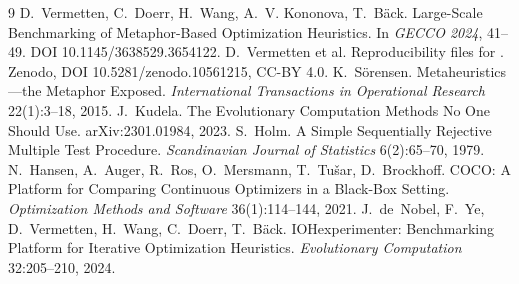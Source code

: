 \documentclass[11pt]{article}
\begin{document}
\begin{thebibliography}{9}
 D.~Vermetten, C.~Doerr, H.~Wang, A.~V. Kononova, T.~B\"ack.
Large-Scale Benchmarking of Metaphor-Based Optimization Heuristics. In \emph{GECCO
2024}, 41--49. DOI 10.1145/3638529.3654122.
 D.~Vermetten et al. Reproducibility files for \cite{vermetten24}.
Zenodo, DOI 10.5281/zenodo.10561215, CC-BY 4.0.
 K.~S\"orensen. Metaheuristics---the Metaphor Exposed.
\emph{International Transactions in Operational Research} 22(1):3--18, 2015.
 J.~Kudela. The Evolutionary Computation Methods No One Should Use.
arXiv:2301.01984, 2023.
 S.~Holm. A Simple Sequentially Rejective Multiple Test Procedure.
\emph{Scandinavian Journal of Statistics} 6(2):65--70, 1979.
 N.~Hansen, A.~Auger, R.~Ros, O.~Mersmann, T.~Tu\v{s}ar, D.~Brockhoff.
COCO: A Platform for Comparing Continuous Optimizers in a Black-Box Setting.
\emph{Optimization Methods and Software} 36(1):114--144, 2021.
 J.~de~Nobel, F.~Ye, D.~Vermetten, H.~Wang, C.~Doerr, T.~B\"ack.
IOHexperimenter: Benchmarking Platform for Iterative Optimization Heuristics.
\emph{Evolutionary Computation} 32:205--210, 2024.
\end{thebibliography}
\end{document}
